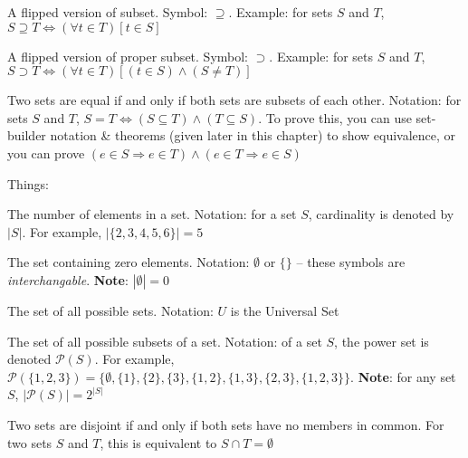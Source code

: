 \documentclass[main.tex]{subfiles}
\begin{document}
\begin{defn}[Superset]
	A flipped version of subset. Symbol: \(\supseteq\). Example: for sets \(S\) and \(T\), \(S \supseteq T \Leftrightarrow (\forall t \in T)[t \in S]\)
\end{defn}

\begin{defn}
	A flipped version of proper subset. Symbol: \(\supset\). Example: for sets \(S\) and \(T\), \(S \supset T \Leftrightarrow (\forall t \in T)[(t \in S) \land (S \neq T)]\)
\end{defn}

\begin{defn}[Equality]
	Two sets are equal if and only if both sets are subsets of each other. Notation: for sets \(S\) and \(T\), \(S = T \Leftrightarrow (S \subseteq T) \land (T \subseteq S)\). To prove this, you can use set-builder notation \& theorems (given later in this chapter) to show equivalence, or you can prove \((e \in S \Rightarrow e \in T) \land (e \in T \Rightarrow e \in S)\)
\end{defn}

Things:

\begin{defn}[Cardinality]
	The number of elements in a set. Notation: for a set \(S\), cardinality is denoted by \(|S|\). For example, $|\{2,3,4,5,6\}| = 5$
\end{defn}

\begin{defn}
	The set containing zero elements. Notation: $\emptyset$ or $\{\}$ -- these symbols are \textit{interchangable}. \textbf{Note}: \(|\emptyset| = 0\)
\end{defn}

\begin{defn}
	The set of all possible sets. Notation: \(U\) is the Universal Set
\end{defn}

\begin{defn}
	The set of all possible subsets of a set. Notation: of a set \(S\), the power set is denoted \(\mathcal{P}(S)\). For example, \(\mathcal{P}(\{1,2,3\}) = \{\emptyset, \{1\}, \{2\}, \{3\}, \{1,2\}, \{1,3\}, \{2,3\}, \{1,2,3\}\}\). \textbf{Note}: for any set \(S\), \(|\mathcal{P}(S)| = 2^{|S|}\)
\end{defn}

\begin{defn}[Disjoint]
	Two sets are disjoint if and only if both sets have no members in common. For two sets \(S\) and \(T\), this is equivalent to \(S \cap T = \emptyset\)
\end{defn}
\end{document}
